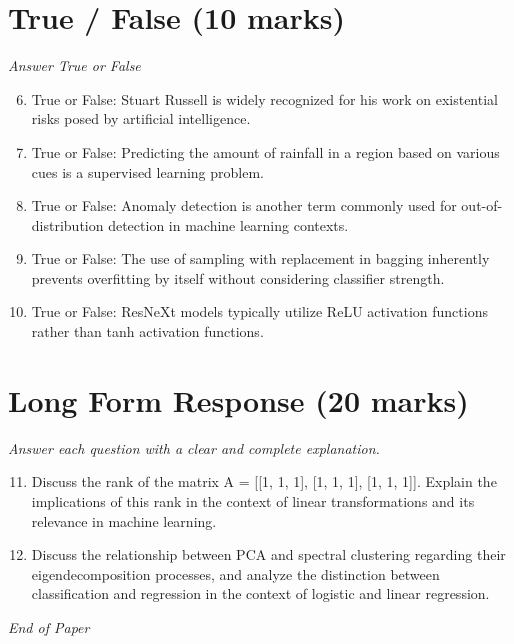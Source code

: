 \documentclass[12pt]{article}
\begin{document}
\section*{True / False (10 marks)}
\textit{Answer True or False}
\begin{enumerate}[label=\arabic*.]
\setcounter{enumi}{5}
\item True or False: Stuart Russell is widely recognized for his work on existential risks posed by artificial intelligence.
\item True or False: Predicting the amount of rainfall in a region based on various cues is a supervised learning problem.
\item True or False: Anomaly detection is another term commonly used for out-of-distribution detection in machine learning contexts.
\item True or False: The use of sampling with replacement in bagging inherently prevents overfitting by itself without considering classifier strength.
\item True or False: ResNeXt models typically utilize ReLU activation functions rather than tanh activation functions.
\end{enumerate}

\section*{Long Form Response (20 marks)}
\textit{Answer each question with a clear and complete explanation.}
\begin{enumerate}[label=\arabic*.]
\setcounter{enumi}{10}
\item Discuss the rank of the matrix A = [[1, 1, 1], [1, 1, 1], [1, 1, 1]]. Explain the implications of this rank in the context of linear transformations and its relevance in machine learning.
\item Discuss the relationship between PCA and spectral clustering regarding their eigendecomposition processes, and analyze the distinction between classification and regression in the context of logistic and linear regression.
\end{enumerate}

\vfill
\noindent\textit{End of Paper}
\end{document}
